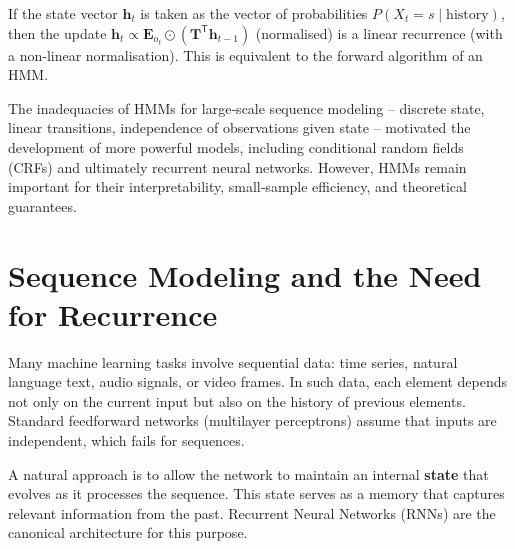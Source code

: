 \documentclass{tufte-handout}
\begin{document}
\begin{thm}
    If the state vector $\mathbf{h}_t$ is taken as the vector of probabilities $P(X_t=s \mid \text{history})$, then the update $\mathbf{h}_t \propto \mathbf{E}_{o_t} \odot (\mathbf{T}^{\mathsf{T}} \mathbf{h}_{t-1})$ (normalised) is a linear recurrence (with a non‑linear normalisation). This is equivalent to the forward algorithm of an HMM.
\end{thm}

The inadequacies of HMMs for large‑scale sequence modeling – discrete state, linear transitions, independence of observations given state – motivated the development of more powerful models, including conditional random fields (CRFs) and ultimately recurrent neural networks. However, HMMs remain important for their interpretability, small‑sample efficiency, and theoretical guarantees.

\begin{marginfigure}
\centering
{}
\caption{Continuous RNN states can represent exponentially more distinct histories than discrete HMM states of the same dimension.}
\end{marginfigure}



\section{Sequence Modeling and the Need for Recurrence}

Many machine learning tasks involve sequential data: time series, natural language text, audio signals, or video frames. In such data, each element depends not only on the current input but also on the history of previous elements. Standard feedforward networks (multilayer perceptrons) assume that inputs are independent, which fails for sequences.

A natural approach is to allow the network to maintain an internal \textbf{state} that evolves as it processes the sequence. This state serves as a memory that captures relevant information from the past. Recurrent Neural Networks (RNNs) are the canonical architecture for this purpose.
\end{document}
